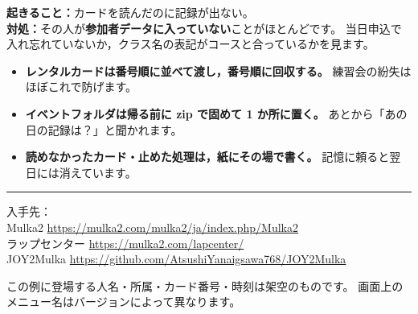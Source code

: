 \documentclass[a4paper,9pt]{ltjsarticle}
\begin{document}
\begin{Fail}
\textbf{起きること：}カードを読んだのに記録が出ない。\\
\textbf{対処：}その人が\textbf{参加者データに入っていない}ことがほとんどです。
当日申込で入れ忘れていないか，クラス名の表記がコースと合っているかを見ます。
\end{Fail}

\begin{Note}[練習会でも守ること]
\begin{itemize}[leftmargin=*,itemsep=0pt]
\item \textbf{レンタルカードは番号順に並べて渡し，番号順に回収する。}
      練習会の紛失はほぼこれで防げます。
\item \textbf{イベントフォルダは帰る前に zip で固めて 1 か所に置く。}
      あとから「あの日の記録は？」と聞かれます。
\item \textbf{読めなかったカード・止めた処理は，紙にその場で書く。}
      記憶に頼ると翌日には消えています。
\end{itemize}
\end{Note}

\vspace{2mm}
\noindent\textcolor{rulec}{\rule{\textwidth}{0.4pt}}\par
\vspace{1mm}
{\footnotesize
入手先：\\
Mulka2 \url{https://mulka2.com/mulka2/ja/index.php/Mulka2}\\
ラップセンター \url{https://mulka2.com/lapcenter/}\\
JOY2Mulka \url{https://github.com/AtsushiYanaigsawa768/JOY2Mulka}\par
この例に登場する人名・所属・カード番号・時刻は架空のものです。
画面上のメニュー名はバージョンによって異なります。}
\end{document}

